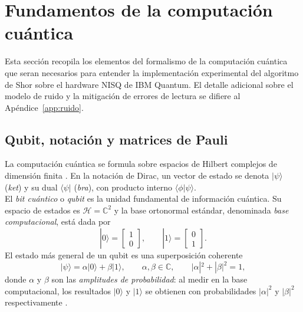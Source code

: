 \documentclass[12pt, spanish]{book}
\begin{document}
\newpage

\section{Fundamentos de la computación cuántica}
\label{sec:fundamentos}
 
Esta sección recopila los elementos del formalismo de la computación cuántica que seran necesarios para entender la implementación experimental del algoritmo de Shor sobre el hardware NISQ de IBM Quantum. El detalle adicional sobre el modelo de ruido y la mitigación de errores de lectura se difiere al Apéndice~\ref{app:ruido}.
 
\subsection{Qubit, notación y matrices de Pauli}
\label{sec:qubit}
 
La computación cuántica se formula sobre espacios de Hilbert complejos de dimensión finita \cite{Nielsen2024, Wong2022}. En la notación de Dirac, un vector de estado se denota $|\psi\rangle$ (\textit{ket}) y su dual $\langle\psi|$ (\textit{bra}), con producto interno $\langle\phi|\psi\rangle$.\\
 
El \textit{bit cuántico} o \textit{qubit} es la unidad fundamental de información cuántica. Su espacio de estados es $\mathcal{H} = \mathbb{C}^2$ y la base ortonormal estándar, denominada \textit{base computacional}, está dada por
\begin{equation}
    |0\rangle = \begin{bmatrix} 1 \\ 0 \end{bmatrix}, \qquad
    |1\rangle = \begin{bmatrix} 0 \\ 1 \end{bmatrix}.
    \label{eq:base_computacional}
\end{equation}
El estado más general de un qubit es una superposición coherente
\begin{equation}
    |\psi\rangle = \alpha|0\rangle + \beta|1\rangle, \qquad \alpha, \beta \in \mathbb{C}, \qquad |\alpha|^2 + |\beta|^2 = 1,
    \label{eq:qubit_general}
\end{equation}
donde $\alpha$ y $\beta$ son las \textit{amplitudes de probabilidad}: al medir en la base computacional, los resultados $|0\rangle$ y $|1\rangle$ se obtienen con probabilidades $|\alpha|^2$ y $|\beta|^2$ respectivamente \cite{Nielsen2024, Wong2022}.\\
 
\end{document}
